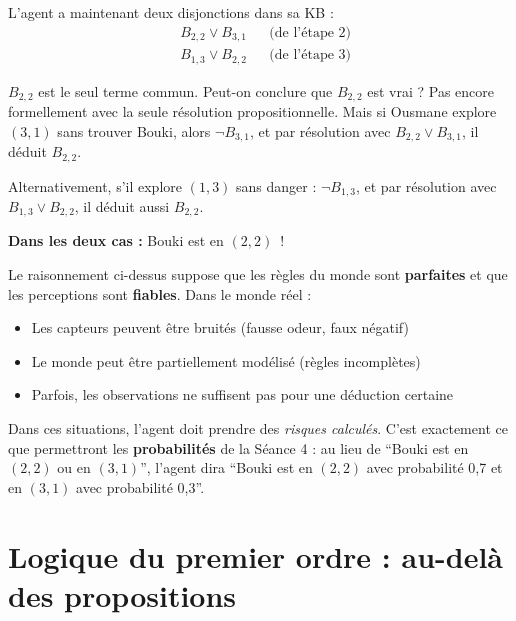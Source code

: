 \documentclass[11pt,a4paper]{article}
\begin{document}
\begin{exemplebox}
L'agent a maintenant deux disjonctions dans sa KB :
\begin{align*}
    &B_{2,2} \lor B_{3,1} && \text{(de l'étape 2)} \\
    &B_{1,3} \lor B_{2,2} && \text{(de l'étape 3)}
\end{align*}

$B_{2,2}$ est le seul terme commun. Peut-on conclure que $B_{2,2}$ est vrai ? Pas encore formellement avec la seule résolution propositionnelle. Mais si Ousmane explore $(3,1)$ sans trouver Bouki, alors $\neg B_{3,1}$, et par résolution avec $B_{2,2} \lor B_{3,1}$, il déduit $B_{2,2}$.

Alternativement, s'il explore $(1,3)$ sans danger : $\neg B_{1,3}$, et par résolution avec $B_{1,3} \lor B_{2,2}$, il déduit aussi $B_{2,2}$.

\textbf{Dans les deux cas :} Bouki est en $(2,2)$~!
\end{exemplebox}

\begin{attentionbox}
Le raisonnement ci-dessus suppose que les règles du monde sont \textbf{parfaites} et que les perceptions sont \textbf{fiables}. Dans le monde réel :
\begin{itemize}[nosep]
    \item Les capteurs peuvent être bruités (fausse odeur, faux négatif)
    \item Le monde peut être partiellement modélisé (règles incomplètes)
    \item Parfois, les observations ne suffisent pas pour une déduction certaine
\end{itemize}
Dans ces situations, l'agent doit prendre des \textit{risques calculés}. C'est exactement ce que permettront les \textbf{probabilités} de la Séance 4 : au lieu de ``Bouki est en $(2,2)$ ou en $(3,1)$'', l'agent dira ``Bouki est en $(2,2)$ avec probabilité 0,7 et en $(3,1)$ avec probabilité 0,3''.
\end{attentionbox}

\section{Logique du premier ordre : au-delà des propositions}
\end{document}
